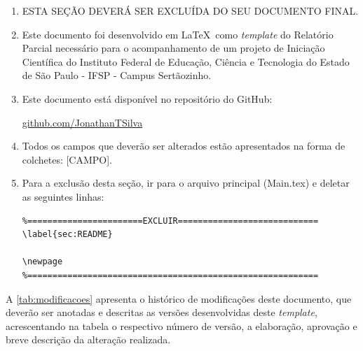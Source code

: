 \documentclass[../Main.tex]{subfiles}
\begin{document}
        \begin{enumerate}
            \item {\color{red} ESTA SEÇÃO DEVERÁ SER EXCLUÍDA DO SEU DOCUMENTO FINAL.}
            
            \item Este documento foi desenvolvido em \LaTeX\ como \textit{template} do Relatório Parcial necessário para o acompanhamento de um projeto de Iniciação Científica do Instituto Federal de Educação, Ciência e Tecnologia do Estado de São Paulo - IFSP - Campus Sertãozinho.
            
            \item Este documento está disponível no repositório do GitHub:
            
            \begin{center}
                \href{https://github.com/JonathanTSilva}{github.com/JonathanTSilva}
            \end{center}
            
            \item Todos os campos que deverão ser alterados estão apresentados na forma de colchetes: [CAMPO].
            
            \item Para a exclusão desta seção, ir para o arquivo principal  (Main.tex) e deletar as seguintes linhas:
            
\begin{verbatim}
%=======================EXCLUIR============================
\label{sec:README}

\newpage
%==========================================================
\end{verbatim}
        \end{enumerate}
         
        A \autoref{tab:modificacoes} apresenta o histórico de modificações deste documento, que deverão ser anotadas e descritas as versões desenvolvidas deste \textit{template}, acrescentando na tabela o respectivo número de versão, a elaboração, aprovação e breve descrição da alteração realizada.
        
\end{document}
